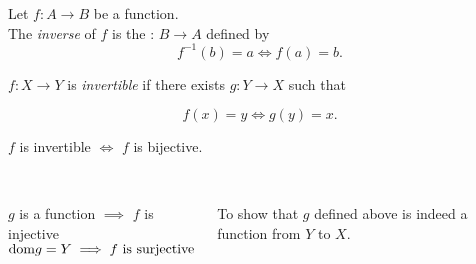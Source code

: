 
\begin{frame}{}
  \begin{center}
  \end{center}

\end{frame}

\begin{frame}{}
  \begin{definition}[Inverse]
    Let $f: A \to B$ be a  function. \\[5pt]

    The {\it inverse} of $f$ is the  : $B \to A$ defined by
    \[
      f^{-1}(b) = a \iff f(a) = b.
    \]
  \end{definition}

  \pause
\end{frame}

\begin{frame}{}
  \begin{definition}[Invertible]
    $f: X \to Y$ is {\it invertible} if there exists $g: Y \to X$ such that

    \[
      f(x) = y \iff g(y) = x.
    \]
  \end{definition}

  \pause
  \begin{theorem}
    $f$ is invertible $\iff$ $f$ is bijective.
  \end{theorem}

  \begin{columns}
      \pause
      \begin{center}
	 \pause \\[10pt]
	$g$ is a function $\implies$ $f$ is injective \\[5pt]
	$\text{dom}{g} = Y \implies f \text{ is surjective}$
      \end{center}
      \pause
      \begin{center}
	 \pause \\[10pt]
	To show that $g$ defined above is indeed a function from $Y$ to $X$.
      \end{center}
  \end{columns}
\end{frame}

